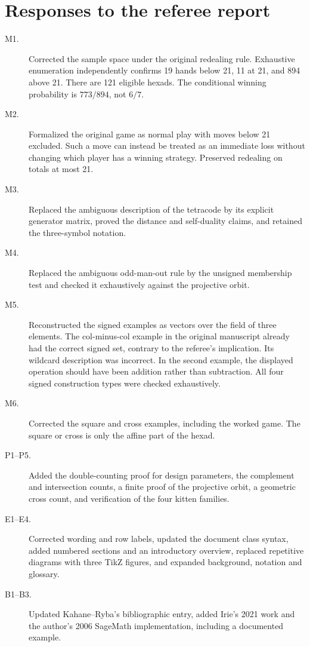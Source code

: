 \documentclass[12pt,letterpaper]{article}
\begin{document}
\section{Responses to the referee report}
\begin{description}
\item[M1.] Corrected the sample space under the original redealing rule. Exhaustive enumeration independently confirms 19 hands below 21, 11 at 21, and 894 above 21. There are 121 eligible hexads. The conditional winning probability is $773/894$, not $6/7$.
\item[M2.] Formalized the original game as normal play with moves below 21 excluded. Such a move can instead be treated as an immediate loss without changing which player has a winning strategy. Preserved redealing on totals at most 21.
\item[M3.] Replaced the ambiguous description of the tetracode by its explicit generator matrix, proved the distance and self-duality claims, and retained the three-symbol notation.
\item[M4.] Replaced the ambiguous odd-man-out rule by the unsigned membership test and checked it exhaustively against the projective orbit.
\item[M5.] Reconstructed the signed examples as vectors over the field of three elements. The col-minus-col example in the original manuscript already had the correct signed set, contrary to the referee's implication. Its wildcard description was incorrect. In the second example, the displayed operation should have been addition rather than subtraction. All four signed construction types were checked exhaustively.
\item[M6.] Corrected the square and cross examples, including the worked game. The square or cross is only the affine part of the hexad.
\item[P1--P5.] Added the double-counting proof for design parameters, the complement and intersection counts, a finite proof of the projective orbit, a geometric cross count, and verification of the four kitten families.
\item[E1--E4.] Corrected wording and row labels, updated the document class syntax, added numbered sections and an introductory overview, replaced repetitive diagrams with three TikZ figures, and expanded background, notation and glossary.
\item[B1--B3.] Updated Kahane--Ryba's bibliographic entry, added Irie's 2021 work and the author's 2006 SageMath implementation, including a documented example.
\end{description}
\end{document}
